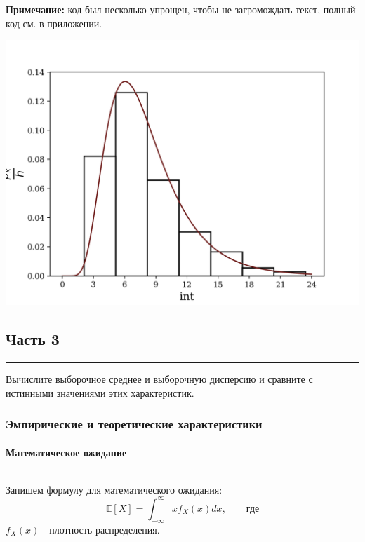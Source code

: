 \documentclass[a4paper, 14pt]{extarticle}
\begin{document}
{\footnotesize \textbf{Примечание:} код был несколько упрощен, чтобы не загромождать текст, 
полный код см. в приложении.}

\vfill
\includegraphics[width=1\textwidth]{histXpdf}
\vfill

\newpage

\subsection{Часть 3}\vspace{-20pt}\rule{\linewidth}{0.1mm}

Вычислите выборочное среднее и выборочную дисперсию и сравните с 
истинными значениями этих характеристик.

\subsubsection{Эмпирические и теоретические характеристики}

\paragraph{Математическое ожидание}\vspace{-20pt}\rule{\linewidth}{0.1mm}

Запишем формулу для математического ожидания:
\begin{equation}
  \mathbb{E}[X] = \int_{-\infty}^{\infty} x f_X (x) dx, \qquad \text{где}
\end{equation}
$f_X (x)$ - плотность распределения.\\ 
\end{document}
